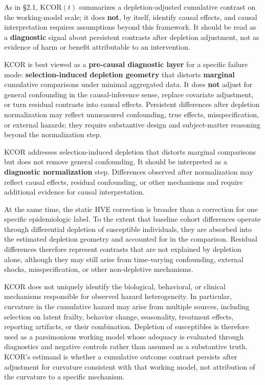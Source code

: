 \documentclass[
]{article}
\begin{document}
As in §2.1, \(\mathrm{KCOR}(t)\) summarizes a depletion-adjusted
cumulative contrast on the working-model scale; it does \textbf{not}, by
itself, identify causal effects, and causal interpretation requires
assumptions beyond this framework. It should be read as a
\textbf{diagnostic} signal about persistent contrasts after depletion
adjustment, not as evidence of harm or benefit attributable to an
intervention.

KCOR is best viewed as a \textbf{pre-causal diagnostic layer} for a
specific failure mode: \textbf{selection-induced depletion geometry}
that distorts \textbf{marginal} cumulative comparisons under minimal
aggregated data. It does \textbf{not} adjust for general confounding in
the causal-inference sense, replace covariate adjustment, or turn
residual contrasts into causal effects. Persistent differences after
depletion normalization may reflect unmeasured confounding, true
effects, misspecification, or external hazards; they require substantive
design and subject-matter reasoning beyond the normalization step.

KCOR addresses selection-induced depletion that distorts marginal
comparisons but does not remove general confounding. It should be
interpreted as a \textbf{diagnostic normalization} step. Differences
observed after normalization may reflect causal effects, residual
confounding, or other mechanisms and require additional evidence for
causal interpretation.

At the same time, the static HVE correction is broader than a correction
for one specific epidemiologic label. To the extent that baseline cohort
differences operate through differential depletion of susceptible
individuals, they are absorbed into the estimated depletion geometry and
accounted for in the comparison. Residual differences therefore
represent contrasts that are not explained by depletion alone, although
they may still arise from time-varying confounding, external shocks,
misspecification, or other non-depletive mechanisms.

KCOR does not uniquely identify the biological, behavioral, or clinical
mechanisms responsible for observed hazard heterogeneity. In particular,
curvature in the cumulative hazard may arise from multiple sources,
including selection on latent frailty, behavior change, seasonality,
treatment effects, reporting artifacts, or their combination. Depletion
of susceptibles is therefore used as a parsimonious working model whose
adequacy is evaluated through diagnostics and negative controls rather
than assumed as a substantive truth. KCOR's estimand is whether a
cumulative outcome contrast persists after adjustment for curvature
consistent with that working model, not attribution of the curvature to
a specific mechanism.
\end{document}
